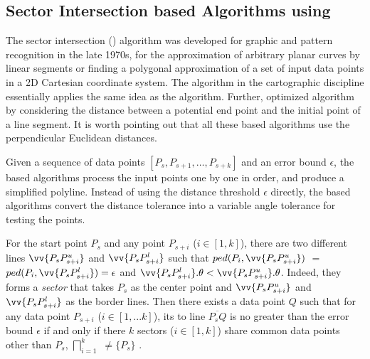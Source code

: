 \subsection{Sector Intersection based Algorithms using \ped}
\label{sub-ci-ped}


The sector intersection (\cia) algorithm \cite{Williams:Longest, Sklansky:Cone} was developed for graphic and pattern recognition in the late 1970s, for the approximation of arbitrary planar curves by linear segments or finding a polygonal approximation of a set of input data points in a 2D Cartesian coordinate system. The \sleeve algorithm \cite{Zhao:Sleeve} in the cartographic discipline essentially applies the same idea as the \cia algorithm.
Further, \cite{Dunham:Cone}  optimized algorithm \cia by considering the distance between a potential end point and the initial point of a line segment. It is worth pointing out that all these \cia based algorithms use the perpendicular Euclidean distances.


Given a sequence of data points $[P_{s}, P_{s+1}, \ldots, P_{s+k}]$ and an error bound $\epsilon$, the \cia based algorithms process the input points one by one in order, and produce a simplified polyline.  Instead of using the distance threshold $\epsilon$ directly, the \cia based algorithms convert the distance tolerance into a variable angle tolerance for testing the points.

For the start point $P_s$ and any point $P_{s+i}$ ($i\in[1, k]$), there are two different lines $\vv{P_sP^u_{s+i}}$ and $\vv{P_sP^l_{s+i}}$ such that $ped(P_i, \vv{P_sP^u_{s+i}})$ $=$ $ped(P_i, \vv{P_sP^l_{s+i}}) = \epsilon$ and $\vv{P_sP^l_{s+i}}.\theta < \vv{P_sP^u_{s+i}}.\theta$. Indeed, they forms a \emph{sector}  that takes $P_s$ as the center point and $\vv{P_sP^u_{s+i}}$ and $\vv{P_sP^l_{s+i}}$ as the border lines.
Then there exists a data point $Q$ such that for any data point $P_{s+i}$ ($i \in [1, ... k]$), its \ped to
line $\overline{P_sQ}$ is no greater than the error bound $\epsilon$ if and only if there $k$ sectors  ($i\in[1,k]$) share common data points other than $P_s$, \ie $\bigsqcap_{i=1}^{k}$ $\ne \{P_s\}$ \cite{Williams:Longest, Sklansky:Cone,Zhao:Sleeve}.

